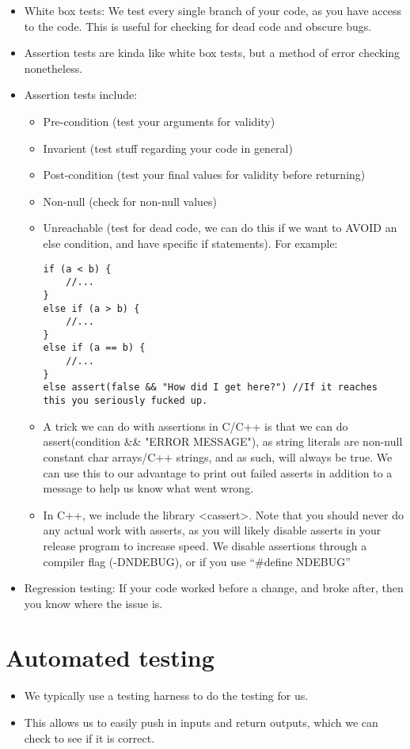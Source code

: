 \documentclass{article}
\begin{document}
\begin{itemize}
\begin{itemize}
\end{itemize}
\item White box tests: We test every single branch of your code, as you have access to the code.  This is useful for checking for dead code and obscure bugs.
\item Assertion tests are kinda like white box tests, but a method of error checking nonetheless. 
\item Assertion tests include:
\begin{itemize}
\item Pre-condition (test your arguments for validity)
\item Invarient (test stuff regarding your code in general)
\item Post-condition (test your final values for validity before returning)
\item Non-null (check for non-null values)
\item Unreachable (test for dead code, we can do this if we want to AVOID an else condition, and have specific if statements).  For example:
\begin{lstlisting}
if (a < b) {
    //...
}
else if (a > b) {
    //...
}
else if (a == b) {
    //...
}
else assert(false && "How did I get here?") //If it reaches this you seriously fucked up.
\end{lstlisting}
\item A trick we can do with assertions in C/C++ is that we can do assert(condition \&\& "ERROR MESSAGE"), as string literals are non-null constant char arrays/C++ strings, and as such, will always be true.  We can use this to our advantage to print out failed asserts in addition to a message to help us know what went wrong.
\item In C++, we include the library <cassert>.  Note that you should never do any actual work with asserts, as you will likely disable asserts in your release program to increase speed.  We disable assertions through a compiler flag (-DNDEBUG), or if you use ``#define NDEBUG''
\end{itemize}
\item Regression testing: If your code worked before a change, and broke after, then you know where the issue is.
\end{itemize}

\section{Automated testing}
\begin{itemize}
\item We typically use a testing harness to do the testing for us.
\item This allows us to easily push in inputs and return outputs, which we can check to see if it is correct.  
\end{itemize}
\end{document}
